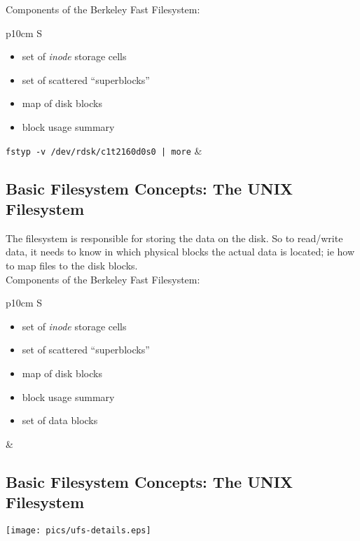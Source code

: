 \documentclass[xga]{xdvislides}
\begin{document}
Components of the Berkeley Fast Filesystem:
\\

\begin{tabular}{ p{10cm} S }
\begin{itemize}
	\item set of {\em inode} storage cells
	\item set of scattered ``superblocks''
	\item map of disk blocks
	\item block usage summary
\end{itemize}
{\tt fstyp -v /dev/rdsk/c1t2160d0s0  | more}
&  \\
\end{tabular}

\subsection{Basic Filesystem Concepts: The UNIX Filesystem}
The filesystem is responsible for storing the data on the disk.
So to read/write data, it needs to know in which physical blocks the actual
data is located; ie how to map files to the disk blocks.
\\

Components of the Berkeley Fast Filesystem:
\\

\begin{tabular}{ p{10cm} S }
\begin{itemize}
	\item set of {\em inode} storage cells
	\item set of scattered ``superblocks''
	\item map of disk blocks
	\item block usage summary
	\item set of data blocks
\end{itemize}
&  \\
\end{tabular}

\subsection{Basic Filesystem Concepts: The UNIX Filesystem}
\begin{center}
	\texttt{[image: pics/ufs-details.eps]} \\
\end{center}
\vspace*{\fill}
\end{document}
